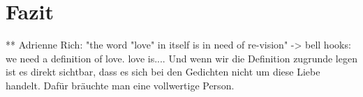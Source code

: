 \section{Fazit}

  ** Adrienne Rich: "the word "love" in itself is in need of re-vision"
  -> bell hooks: we need a definition of love.
  love is....
  Und wenn wir die Definition zugrunde legen ist es direkt sichtbar, dass es sich bei den Gedichten nicht um diese Liebe handelt.
  Dafür bräuchte man eine vollwertige Person.

\begin{comment}
    [Kolodny1980]

"What makes it so exciting, of course, is
that it can be constantly relearned and refined, so as to provide
either an individual or an entire reading community, over time,
with infinite variations of the same text. It can provide that, but,
I must add, too often it does not"
Quote Komilitonin mit: "universell menschliches fleischliches Begehren" -> und argue that we need critical feminist thinking education in order to shift perspectives in such readings.
Fast der ganze Kurs mit Ausnahme der Professorin und ein paar Studentinnen, die über das Durschnittsalter von 22 waren, scheinten mit der Leseweise kein Problem zu haben.
Ich frage mich was die selbe Person heute darüber sagen würde, wenn sie die Gedichte nochmal liest.

\end{comment}

